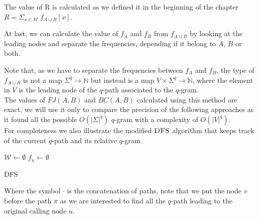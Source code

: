 	The value of R is calculated as we defined it in the beginning of the chapter $R = \Sigma_{x \in \mathcal{W} }{\ f_{A \cup B}[x] }$.

	At last, we can calculate the value of $f_{A}$ and $f_{B}$ from $f_{A \cup B}$ by looking at the leading nodes and separate the frequencies, 
	depending if it belong to $A$, $B$ or both.

	Note that, as we have to separate the frequencies between $f_{A}$ and $f_{B}$, the type of $f_{A \cup B}$ is not a map $ \Sigma^{q} \rightarrow \mathbb{N}$
	but instead is a map $V \times \Sigma^{q} \rightarrow \mathbb{N}$, where the element in $V$ is the leading node of the $q$-path associated to the $q$-gram.\\ 
	
	The values of $FJ(A,B)$ and $BC(A,B)$ calculated using this method are exact, we will use it only to compare the precision of the following approaches as it found all the possible $O(|\Sigma|^{q})$ $q$-gram with a complexity of $O(|V|^{q})$.\\
	
	For completeness we also illustrate the modified $\textsc{DFS}$ algorithm that keeps track of the current $q$-path and its relative $q$-gram.
	
    \begin{algorithm}[h]
		\small
		\DontPrintSemicolon
		\BlankLine
		$\mathcal{W} \gets \emptyset$\;
		$f_{u} \gets \emptyset$ \quad \;    
		\BlankLine
		\BlankLine
		\caption{\textsc{DFS}}
		\label{alg:brute-force}
	\end{algorithm}

	Where the symbol $\cdot$ is the concatenation of paths, note that we put the node $v$ before the path $\pi$ as we are interested to find all the $q$-path leading to the original calling node $u$.\\
	
